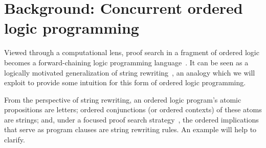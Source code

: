 \documentclass[
  class=../hdeyoung-proposal,
  crop=false
]{standalone}
\begin{document}
\section{Background: Concurrent ordered logic programming}\label{sec:ordered-lp}

Viewed through a computational lens, proof search in a fragment of ordered logic becomes a forward-chaining logic programming language~\autocite{Pfenning+Simmons:LICS09}.
It can be seen as a logically motivated generalization of string rewriting~\autocite[see, \eg,][]{Book+Otto:SRS93}, an analogy which we will exploit to provide some intuition for this form of ordered logic programming.

From the perspective of string rewriting, an ordered logic program's atomic propositions are letters; ordered conjunctions (or ordered contexts) of these atoms are strings; and, under a focused proof search strategy~\autocite{Andreoli:JLC92}, the ordered implications that serve as program clauses are string rewriting rules.
An example will help to clarify.





\end{document}
